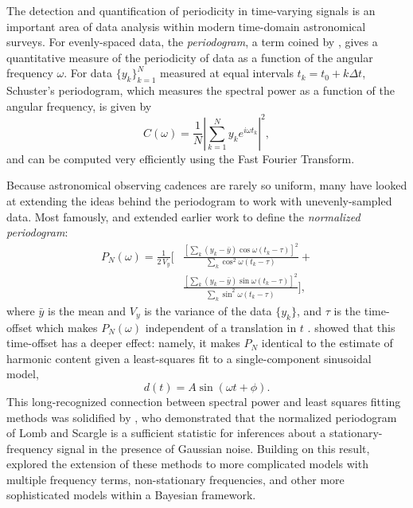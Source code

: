 \documentclass{emulateapj}
\newcommand{\eqlabel}[1]{\label{eq:#1}}
\begin{document}
The detection and quantification of periodicity in time-varying signals is an important area of data analysis within modern time-domain astronomical surveys.
For evenly-spaced data, the {\it periodogram}, a term coined by \citet{Schuster98}, gives a quantitative measure of the periodicity of data as a function of the angular frequency $\omega$. For data $\{y_k\}_{k=1}^N$ measured at equal intervals $t_k = t_0 + k\Delta t$, Schuster's periodogram, which measures the spectral power as a function of the angular frequency, is given by
\begin{equation}
  \eqlabel{Schuster}
  C(\omega) = \frac{1}{N}\left| \sum_{k=1}^N y_k e^{i\omega t_k} \right|^2,
\end{equation}
and can be computed very efficiently using the Fast Fourier Transform.

Because astronomical observing cadences are rarely so uniform, many have looked at extending the ideas behind the periodogram to work with unevenly-sampled data. Most famously, \citet{Lomb76} and \citet{Scargle82} extended earlier work to define the {\it normalized periodogram}:
\begin{eqnarray}
  \eqlabel{LombScargle}
  P_N(\omega) = \frac{1}{2\,V_y}
  \Bigg[&\frac{\left[\sum_k(y_k - \bar{y})\cos\omega(t_k - \tau)\right]^2}
    {\sum_k \cos^2\omega(t_k - \tau)} +\nonumber\\
   & \frac{\left[\sum_k(y_k - \bar{y})\sin\omega(t_k - \tau)\right]^2}
    {\sum_k \sin^2\omega(t_k - \tau)}\Bigg],
\end{eqnarray}
where $\bar{y}$ is the mean and $V_y$ is the variance of the data $\{y_k\}$, and $\tau$ is the time-offset which makes $P_N(\omega)$ independent of a translation in $t$ \citep[see][for an in-depth discussion]{NumRec}. \citet{Lomb76} showed that this time-offset has a deeper effect: namely, it makes $P_N$ identical to the estimate of harmonic content given a least-squares fit to a single-component sinusoidal model,
\begin{equation}
  \eqlabel{SingleModel}
  d(t) = A\sin(\omega t + \phi).
\end{equation}
This long-recognized connection between spectral power and least squares fitting methods was solidified by \citet{Jaynes87}, who demonstrated that the normalized periodogram of Lomb and Scargle is a sufficient statistic for inferences about a stationary-frequency signal in the presence of Gaussian noise. Building on this result, \citet{Bretthorst88} explored the extension of these methods to more complicated models with multiple frequency terms, non-stationary frequencies, and other more sophisticated models within a Bayesian framework.
\end{document}
